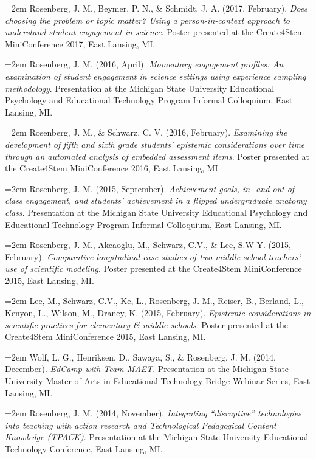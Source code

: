 \documentclass[
  14,
]{article}
\begin{document}
\hangindent=2em Rosenberg, J. M., Beymer, P. N., \& Schmidt, J. A.
(2017, February). \emph{Does choosing the problem or topic matter? Using
a person-in-context approach to understand student engagement in
science}. Poster presented at the Create4Stem MiniConference 2017, East
Lansing, MI.

\hangindent=2em Rosenberg, J. M. (2016, April). \emph{Momentary
engagement profiles: An examination of student engagement in science
settings using experience sampling methodology}. Presentation at the
Michigan State University Educational Psychology and Educational
Technology Program Informal Colloquium, East Lansing, MI.

\hangindent=2em Rosenberg, J. M., \& Schwarz, C. V. (2016, February).
\emph{Examining the development of fifth and sixth grade students'
epistemic considerations over time through an automated analysis of
embedded assessment items}. Poster presented at the Create4Stem
MiniConference 2016, East Lansing, MI.

\hangindent=2em Rosenberg, J. M. (2015, September). \emph{Achievement
goals, in- and out-of-class engagement, and students' achievement in a
flipped undergraduate anatomy class}. Presentation at the Michigan State
University Educational Psychology and Educational Technology Program
Informal Colloquium, East Lansing, MI.

\hangindent=2em Rosenberg, J. M., Akcaoglu, M., Schwarz, C.V., \& Lee,
S.W-Y. (2015, February). \emph{Comparative longitudinal case studies of
two middle school teachers' use of scientific modeling}. Poster
presented at the Create4Stem MiniConference 2015, East Lansing, MI.

\hangindent=2em Lee, M., Schwarz, C.V., Ke, L., Rosenberg, J. M.,
Reiser, B., Berland, L., Kenyon, L., Wilson, M., Draney, K. (2015,
February). \emph{Epistemic considerations in scientific practices for
elementary \& middle schools}. Poster presented at the Create4Stem
MiniConference 2015, East Lansing, MI.

\hangindent=2em Wolf, L. G., Henriksen, D., Sawaya, S., \& Rosenberg, J.
M. (2014, December). \emph{EdCamp with Team MAET}. Presentation at the
Michigan State University Master of Arts in Educational Technology
Bridge Webinar Series, East Lansing, MI.

\hangindent=2em Rosenberg, J. M. (2014, November). \emph{Integrating
``disruptive'' technologies into teaching with action research and
Technological Pedagogical Content Knowledge (TPACK)}. Presentation at
the Michigan State University Educational Technology Conference, East
Lansing, MI.
\end{document}
